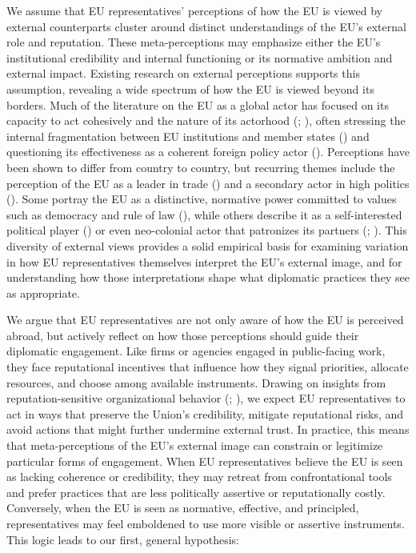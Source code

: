 \documentclass[
  letterpaper,
  DIV=11,
  numbers=noendperiod]{scrartcl}
\begin{document}
We assume that EU representatives' perceptions of how the EU is viewed
by external counterparts cluster around distinct understandings of the
EU's external role and reputation. These meta-perceptions may emphasize
either the EU's institutional credibility and internal functioning or
its normative ambition and external impact. Existing research on
external perceptions supports this assumption, revealing a wide spectrum
of how the EU is viewed beyond its borders. Much of the literature on
the EU as a global actor has focused on its capacity to act cohesively
and the nature of its actorhood
(;
), often stressing the
internal fragmentation between EU institutions and member states
() and
questioning its effectiveness as a coherent foreign policy actor
(). Perceptions have been
shown to differ from country to country, but recurring themes include
the perception of the EU as a leader in trade
() and a secondary
actor in high politics (). Some portray the EU as a distinctive, normative power
committed to values such as democracy and rule of law
(), while others describe it as
a self-interested political player
() or even neo-colonial
actor that patronizes its partners
(;
). This diversity of
external views provides a solid empirical basis for examining variation
in how EU representatives themselves interpret the EU's external image,
and for understanding how those interpretations shape what diplomatic
practices they see as appropriate.

We argue that EU representatives are not only aware of how the EU is
perceived abroad, but actively reflect on how those perceptions should
guide their diplomatic engagement. Like firms or agencies engaged in
public-facing work, they face reputational incentives that influence how
they signal priorities, allocate resources, and choose among available
instruments. Drawing on insights from reputation-sensitive
organizational behavior
(;
), we
expect EU representatives to act in ways that preserve the Union's
credibility, mitigate reputational risks, and avoid actions that might
further undermine external trust. In practice, this means that
meta-perceptions of the EU's external image can constrain or legitimize
particular forms of engagement. When EU representatives believe the EU
is seen as lacking coherence or credibility, they may retreat from
confrontational tools and prefer practices that are less politically
assertive or reputationally costly. Conversely, when the EU is seen as
normative, effective, and principled, representatives may feel
emboldened to use more visible or assertive instruments. This logic
leads to our first, general hypothesis:
\end{document}
